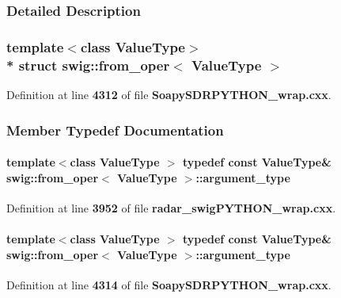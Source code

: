 \subsubsection{Detailed Description}
\subsubsection*{template$<$class Value\+Type$>$\\*
struct swig\+::from\+\_\+oper$<$ Value\+Type $>$}



Definition at line {\bf 4312} of file {\bf Soapy\+S\+D\+R\+P\+Y\+T\+H\+O\+N\+\_\+wrap.\+cxx}.



\subsubsection{Member Typedef Documentation}
\paragraph[{argument\+\_\+type}]{\setlength{\rightskip}{0pt plus 5cm}template$<$class Value\+Type $>$ typedef const Value\+Type\& {\bf swig\+::from\+\_\+oper}$<$ Value\+Type $>$\+::{\bf argument\+\_\+type}}\label{structswig_1_1from__oper_a33151174816bb2d002b7b504bcfc1902}


Definition at line {\bf 3952} of file {\bf radar\+\_\+swig\+P\+Y\+T\+H\+O\+N\+\_\+wrap.\+cxx}.

\paragraph[{argument\+\_\+type}]{\setlength{\rightskip}{0pt plus 5cm}template$<$class Value\+Type $>$ typedef const Value\+Type\& {\bf swig\+::from\+\_\+oper}$<$ Value\+Type $>$\+::{\bf argument\+\_\+type}}\label{structswig_1_1from__oper_a33151174816bb2d002b7b504bcfc1902}


Definition at line {\bf 4314} of file {\bf Soapy\+S\+D\+R\+P\+Y\+T\+H\+O\+N\+\_\+wrap.\+cxx}.

